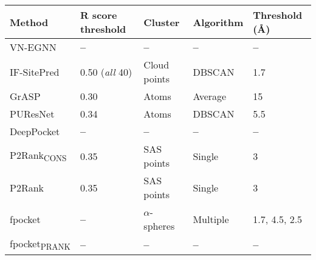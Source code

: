 \begin{landscape}
\begin{longtable}{|M{25mm}|M{29mm}|M{27mm}|M{22mm}|M{19mm}|M{19mm}|M{15mm}|M{15mm}|M{15mm}|M{16mm}|M{15mm}|M{23mm}|M{15mm}|}
\label{tab:methods_details_1}\\
\end{longtable}
\end{landscape}

\begin{landscape}
\begin{longtable}{|M{35mm}|M{45mm}|M{35mm}|M{35mm}|M{35mm}|}
\hline
\textbf{Method} & \textbf{R score threshold}  & \textbf{Cluster} & \textbf{Algorithm}   & \textbf{Threshold} (\AA{})\\ \hline
\endfirsthead
%
\endhead
%
VN-EGNN       & \textbf{--}                 & \textbf{--}            & \textbf{--}         & \textbf{--}         \\ \hline
IF-SitePred   & 0.50 (\textit{all} 40)      & Cloud points & DBSCAN    & 1.7       \\ \hline
GrASP         & 0.30               & Atoms        & Average   & 15        \\ \hline
PUResNet      & 0.34              & Atoms        & DBSCAN    & 5.5       \\ \hline
DeepPocket    & \textbf{--}                 & \textbf{--}            & \textbf{--}         & \textbf{--}         \\ \hline
P2Rank\textsubscript{CONS}    & 0.35              & SAS points   & Single    & 3         \\ \hline
P2Rank        & 0.35              & SAS points   & Single    & 3         \\ \hline
fpocket       & \textbf{--}                 & $\alpha$-spheres   & Multiple  & 1.7, 4.5, 2.5         \\ \hline
fpocket\textsubscript{PRANK}       & \textbf{--}                 & \textbf{--}   & \textbf{--}  & \textbf{--}         \\ \hline

\end{longtable}
\end{landscape}
